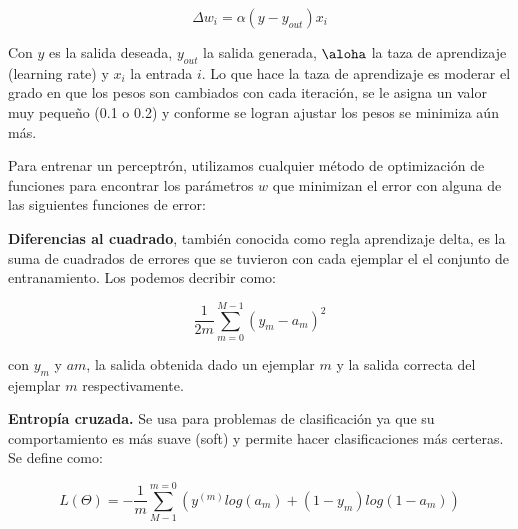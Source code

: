 \begin{equation}
 \Delta w_{i} = \alpha(y - y_{out})x_{i}
\end{equation}

 
Con $y$ es la salida deseada, $y_{out}$ la salida generada, $\aloha$ la taza de aprendizaje (learning rate) y $x_{i}$ la entrada $i$. Lo que hace la taza de aprendizaje es moderar el grado en que los pesos son cambiados con cada iteración, se le asigna un valor muy pequeño (0.1 o 0.2) y conforme se logran ajustar los pesos se minimiza aún más. 




Para entrenar un perceptrón, utilizamos cualquier método de optimización de funciones para encontrar los parámetros $w$ que minimizan el error con alguna de las siguientes funciones de error:

\begin{description}
   
 \item \textbf{Diferencias al cuadrado}, también conocida como regla aprendizaje delta, es la suma de cuadrados de errores que se tuvieron con cada ejemplar el el conjunto de entranamiento. Los podemos decribir como: 
 
 \begin{equation}
   \dfrac{1}{2m}\sum_{m=0}^{M-1} (y_{m} - a_{m})^2
 \end{equation}
 
 con $y_{m}$ y $a{m}$, la salida obtenida dado un ejemplar $m$ y la salida correcta del ejemplar $m$ respectivamente.
 
 \item \textbf{Entropía cruzada.} Se usa para problemas de clasificación ya que su comportamiento es más suave (soft) y permite hacer clasificaciones más certeras. Se define como:

 \begin{equation}
  L (\Theta) = -\dfrac{1}{m}\sum_{M-1}^{m=0}(y^(m)log(a_{m}) + (1-y_{m}) log(1-a_{m})) 
 \end{equation}

\end{description}

